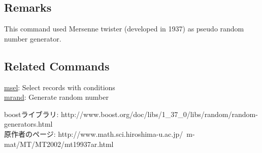 \documentclass[a4paper]{jarticle}
\begin{document}
\subsection*{Remarks}
This command used Mersenne twister (developed in 1937) as pseudo random number generator.

\subsection*{Related Commands}
\noindent
\href{run:msel.pdf}{msel}: Select records with conditions \\
\href{run:mrand.pdf}{mrand}: Generate random number 

\begin{thebibliography}{8}
boostライブラリ: http://www.boost.org/doc/libs/1\_37\_0/libs/random/random-generators.html\\
原作者のページ: http://www.math.sci.hiroshima-u.ac.jp/~m-mat/MT/MT2002/mt19937ar.html
\end{thebibliography}
\end{document}
